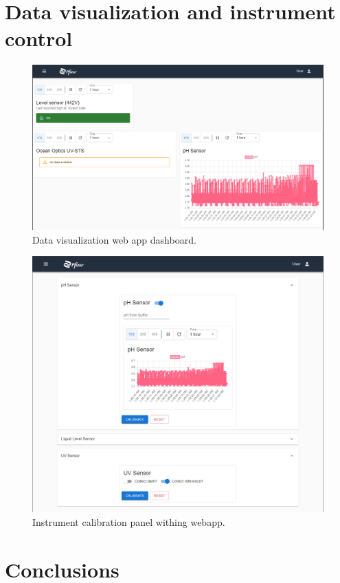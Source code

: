 \documentclass[10pt]{article}
\begin{document}
\section*{Data visualization and instrument control}

\blindtext

\begin{figure}[h]
\centering
\includegraphics[width=1\textwidth]{webapp_aws}
\caption{Data visualization web app dashboard.}
\label{webapp_aws}
\end{figure}

\begin{figure}[h]
\centering
\includegraphics[width=1\textwidth]{webapp_aws2}
\caption{Instrument calibration panel withing webapp.}
\label{webapp_aws2}
\end{figure}

\section*{Conclusions}

\blindtext
\end{document}
